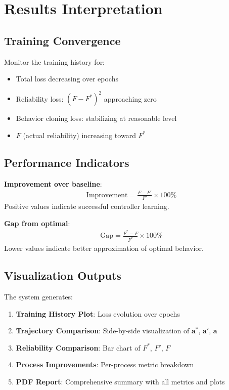 \documentclass[11pt,a4paper]{article}
\begin{document}
\section{Results Interpretation}

\subsection{Training Convergence}
Monitor the training history for:
\begin{itemize}
    \item Total loss decreasing over epochs
    \item Reliability loss: $(F - F^*)^2$ approaching zero
    \item Behavior cloning loss: stabilizing at reasonable level
    \item $F$ (actual reliability) increasing toward $F^*$
\end{itemize}

\subsection{Performance Indicators}

\textbf{Improvement over baseline}:
\begin{align}
\text{Improvement} = \frac{F - F'}{F'} \times 100\%
\end{align}
Positive values indicate successful controller learning.

\textbf{Gap from optimal}:
\begin{align}
\text{Gap} = \frac{F^* - F}{F^*} \times 100\%
\end{align}
Lower values indicate better approximation of optimal behavior.

\subsection{Visualization Outputs}
The system generates:
\begin{enumerate}
    \item \textbf{Training History Plot}: Loss evolution over epochs
    \item \textbf{Trajectory Comparison}: Side-by-side visualization of $\mathbf{a}^*$, $\mathbf{a}'$, $\mathbf{a}$
    \item \textbf{Reliability Comparison}: Bar chart of $F^*$, $F'$, $F$
    \item \textbf{Process Improvements}: Per-process metric breakdown
    \item \textbf{PDF Report}: Comprehensive summary with all metrics and plots
\end{enumerate}
\end{document}
